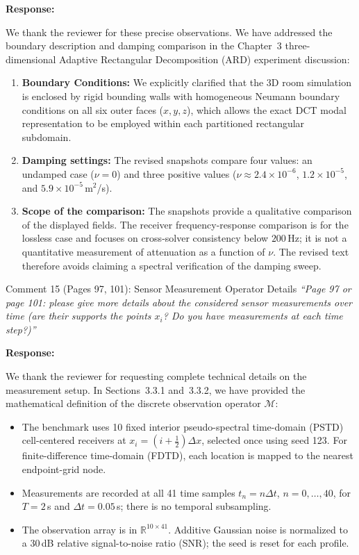 \documentclass[11pt,a4paper]{article}
\newenvironment{response}{
    \par\vspace{1mm}\noindent\textbf{\textcolor{responseframe}{Response:}}\par\vspace{1mm}
}{
    \par\vspace{3mm}
}
\begin{document}
\begin{response}
We thank the reviewer for these precise observations. We have addressed the boundary description and damping comparison in the Chapter~3 three-dimensional Adaptive Rectangular Decomposition (ARD) experiment discussion:
\begin{enumerate}[leftmargin=*]
    \item \textbf{Boundary Conditions:} We explicitly clarified that the 3D room simulation is enclosed by rigid bounding walls with homogeneous Neumann boundary conditions on all six outer faces ($x, y, z$), which allows the exact DCT modal representation to be employed within each partitioned rectangular subdomain.
    \item \textbf{Damping settings:} The revised snapshots compare four values: an undamped case ($\nu=0$) and three positive values ($\nu\approx2.4\times10^{-6}$, $1.2\times10^{-5}$, and $5.9\times10^{-5}$\,m$^2$/s).
    \item \textbf{Scope of the comparison:} The snapshots provide a qualitative comparison of the displayed fields. The receiver frequency-response comparison is for the lossless case and focuses on cross-solver consistency below $200$\,Hz; it is not a quantitative measurement of attenuation as a function of $\nu$. The revised text therefore avoids claiming a spectral verification of the damping sweep.
\end{enumerate}
\end{response}

\vspace{2mm}
\begin{revcomment}{Comment 15 (Pages 97, 101): Sensor Measurement Operator Details}
\emph{``Page 97 or page 101: please give more details about the considered sensor measurements over time (are their supports the points $x_i$? Do you have measurements at each time step?)''}
\end{revcomment}

\begin{response}
We thank the reviewer for requesting complete technical details on the measurement setup. In Sections~3.3.1 and~3.3.2, we have provided the mathematical definition of the discrete observation operator $\mathcal{M}$:
\begin{itemize}[leftmargin=*]
    \item The benchmark uses 10 fixed interior pseudo-spectral time-domain (PSTD) cell-centered receivers at $x_i=(i+\tfrac12)\Delta x$, selected once using seed 123. For finite-difference time-domain (FDTD), each location is mapped to the nearest endpoint-grid node.
    \item Measurements are recorded at all 41 time samples $t_n=n\Delta t$, $n=0,\ldots,40$, for $T=2$\,s and $\Delta t=0.05$\,s; there is no temporal subsampling.
    \item The observation array is in $\mathbb{R}^{10\times41}$. Additive Gaussian noise is normalized to a 30\,dB relative signal-to-noise ratio (SNR); the seed is reset for each profile.
\end{itemize}
\end{response}
\end{document}
